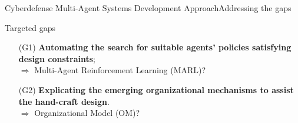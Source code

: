 \begin{frame}{Cyberdefense Multi-Agent Systems Development Approach}{Addressing the gaps}

    \begin{alertblock}{Targeted gaps}
        \begin{enumerate}
            \item[\phantom{X} (G1)] \textbf{Automating the search for suitable agents' policies satisfying design constraints};
                \\ $\Longrightarrow$ Multi-Agent Reinforcement Learning (MARL)?
            \item[\phantom{X} (G2)] \textbf{Explicating the emerging organizational mechanisms to assist the hand-craft design}.
                \\ $\Longrightarrow$ Organizational Model (OM)?
        \end{enumerate}
    \end{alertblock}


    \begin{table}[]


\end{table}
\end{frame}
